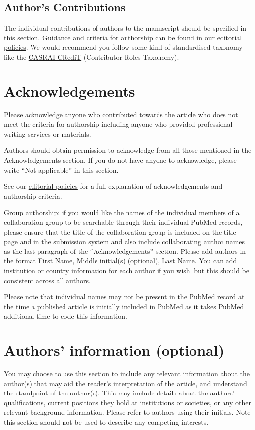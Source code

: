 \documentclass[a4paper,num-refs]{oup-contemporary}
\begin{document}
\subsection{Author's Contributions}

The individual contributions of authors to the manuscript should be specified in this section. Guidance and criteria for authorship can be found in our \href{https://academic.oup.com/gigascience/pages/editorial_policies_and_reporting_standards}{editorial policies}. We would recommend you follow some kind of standardised taxonomy like the \href{http://docs.casrai.org/CRediT}{CASRAI CRediT} (Contributor Roles Taxonomy).


\section{Acknowledgements}

Please acknowledge anyone who contributed towards the article who does not meet the criteria for authorship including anyone who provided professional writing services or materials.

Authors should obtain permission to acknowledge from all those mentioned in the Acknowledgements section. If you do not have anyone to acknowledge, please write ``Not applicable'' in this section.

See our \href{https://academic.oup.com/gigascience/pages/editorial_policies_and_reporting_standards}{editorial policies} for a full explanation of acknowledgements and authorship criteria.

Group authorship: if you would like the names of the individual members of a collaboration group to be searchable through their individual PubMed records, please ensure that the title of the collaboration group is included on the title page and in the submission system and also include collaborating author names as the last paragraph of the “Acknowledgements” section. Please add authors in the format First Name, Middle initial(s) (optional), Last Name. You can add institution or country information for each author if you wish, but this should be consistent across all authors.

Please note that individual names may not be present in the PubMed record at the time a published article is initially included in PubMed as it takes PubMed additional time to code this information.

\section{Authors' information (optional)}

You may choose to use this section to include any relevant information about the author(s) that may aid the reader's interpretation of the article, and understand the standpoint of the author(s). This may include details about the authors' qualifications, current positions they hold at institutions or societies, or any other relevant background information. Please refer to authors using their initials. Note this section should not be used to describe any competing interests.


\end{document}
